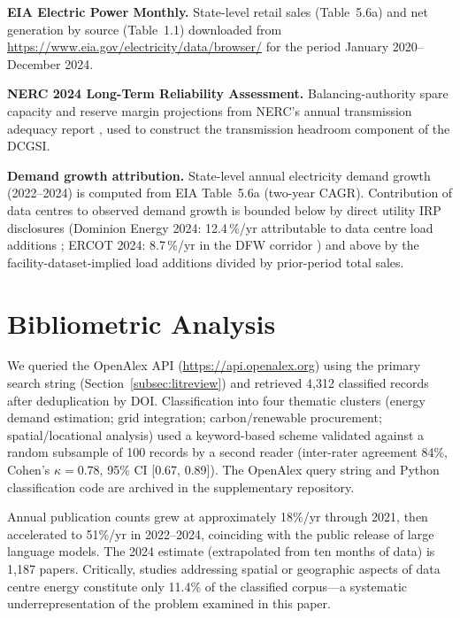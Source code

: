 \documentclass[preprint,12pt]{elsarticle}
\begin{document}
\textbf{EIA Electric Power Monthly.} State-level retail sales (Table~5.6a)
and net generation by source (Table~1.1) downloaded from
\url{https://www.eia.gov/electricity/data/browser/} for the period
January 2020--December 2024.

\begin{sloppypar}
\textbf{NERC 2024 Long-Term Reliability Assessment.} Balancing-authority
spare capacity and reserve margin projections from NERC's annual
transmission adequacy report \cite{nerc2024ltra}, used to construct the
transmission headroom component of the DCGSI.
\end{sloppypar}

\textbf{Demand growth attribution.} State-level annual electricity demand
growth (2022--2024) is computed from EIA Table~5.6a (two-year CAGR).
Contribution of data centres to observed demand growth is bounded below
by direct utility IRP disclosures (Dominion Energy 2024: 12.4\,\%/yr
attributable to data centre load additions \cite{dominionirp2024};
ERCOT 2024: 8.7\,\%/yr in the DFW corridor \cite{ercot2024forecast})
and above by the facility-dataset-implied load additions divided by
prior-period total sales.

\section{Bibliometric Analysis}
\label{sec:bibliometrics}

We queried the OpenAlex API (\url{https://api.openalex.org}) using the
primary search string (Section~\ref{subsec:litreview}) and retrieved
4{,}312 classified records after deduplication by DOI. Classification
into four thematic clusters (energy demand estimation; grid integration;
carbon/renewable procurement; spatial/locational analysis) used a
keyword-based scheme validated against a random subsample of 100 records
by a second reader (inter-rater agreement 84\%, Cohen's
$\kappa = 0.78$, 95\% CI [0.67, 0.89]). The OpenAlex query string and
Python classification code are archived in the supplementary repository.

Annual publication counts grew at approximately 18\%/yr through 2021, then
accelerated to 51\%/yr in 2022--2024, coinciding with the public release
of large language models. The 2024 estimate (extrapolated from ten months
of data) is 1{,}187 papers. Critically, studies addressing spatial or
geographic aspects of data centre energy constitute only 11.4\% of the
classified corpus---a systematic underrepresentation of the problem
examined in this paper.
\end{document}
